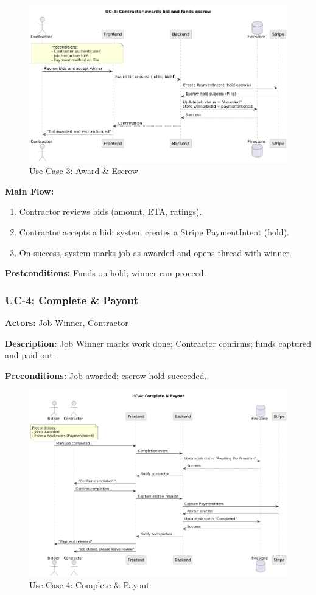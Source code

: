 \documentclass[11pt]{article}
\begin{document}
\begin{figure}[H]
  \centering
  \includegraphics[width=0.9\linewidth]{UC-3.png}
  \caption{Use Case 3: Award \& Escrow}
  \label{fig:uc3}
\end{figure}

\textbf{Main Flow:}
\begin{enumerate}[leftmargin=1.4em]
  \item Contractor reviews bids (amount, ETA, ratings).
  \item Contractor accepts a bid; system creates a Stripe PaymentIntent (hold).
  \item On success, system marks job as awarded and opens thread with winner.
\end{enumerate}
\textbf{Postconditions:} Funds on hold; winner can proceed.

\subsubsection*{UC-4: Complete \& Payout}
\textbf{Actors:} Job Winner, Contractor \par
\textbf{Description:} Job Winner marks work done; Contractor confirms; funds captured and paid out.\par
\textbf{Preconditions:} Job awarded; escrow hold succeeded.\par

\begin{figure}[H]
  \centering
  \includegraphics[width=0.9\linewidth]{UC-4.png}
  \caption{Use Case 4: Complete \& Payout}
  \label{fig:uc4}
\end{figure}
\end{document}
